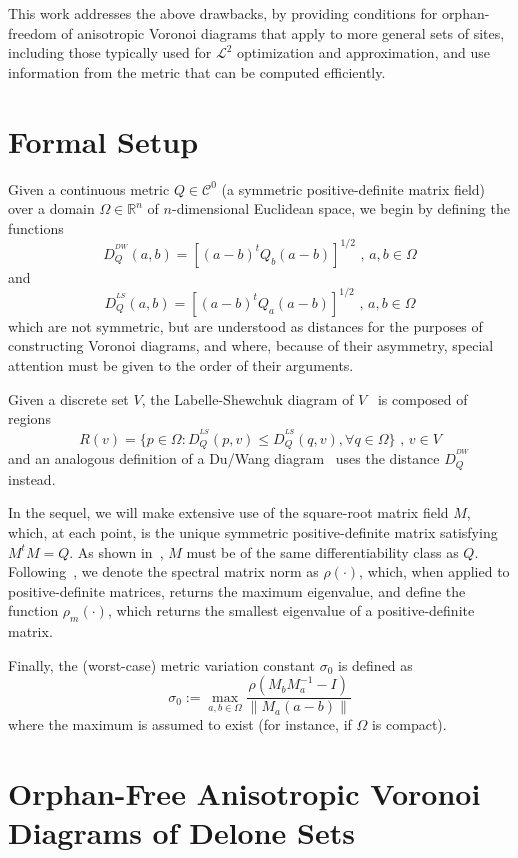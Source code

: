 \documentclass[11pt]{article}
\newcommand{\s}{\sigma}
\renewcommand{\O}{\Omega}
\begin{document}
This work addresses the above drawbacks, by providing conditions for orphan-freedom of anisotropic Voronoi diagrams that apply to more general sets of sites, 
including those typically used for $\mathcal{L}^2$ optimization and approximation, 
and use information from the metric that can be computed efficiently. 


 
\section{Formal Setup}

Given a continuous metric $Q\in\mathcal{C}^0$ (a symmetric positive-definite matrix field) over a domain $\O\in\mathbb{R}^n$ of $n$-dimensional Euclidean space, 
	we begin by defining the functions 
	\[ D_Q^{{ }^{DW}}(a,b) = \left[ (a-b)^t Q_b (a-b) \right]^{1/2} \text{ , } a,b\in\O\]
	and
	\[ D_Q^{{ }^{LS}}(a,b) = \left[ (a-b)^t Q_a (a-b) \right]^{1/2}  \text{ , } a,b\in\O \]
which are not symmetric, but are understood as distances for the purposes of constructing Voronoi diagrams, and where, because of their asymmetry, special attention must be given to the order of their arguments. 
	
Given a discrete set $V$, the Labelle-Shewchuk diagram of $V$~\cite{LS} is composed of regions
\[ R(v) = \{ p\in\O : D_Q^{{ }^{LS}}(p,v) \le D_Q^{{ }^{LS}}(q,v), \forall q\in\O \}  \text{ , } v\in V\]
and an analogous definition of a Du/Wang diagram~\cite{DW} uses the distance $D_Q^{{ }^{DW}}$ instead. 

In the sequel, we will make extensive use of the square-root matrix field $M$, which, at each point, is the unique symmetric positive-definite matrix satisfying $M^t M=Q$. 
As shown in~\cite{avd}, $M$ must be of the same differentiability class as $Q$. 
Following~\cite{avd}, we denote the spectral matrix norm  as $\rho(\cdot)$, which, when applied to positive-definite matrices, returns the maximum eigenvalue, and 
define the function $\rho_m(\cdot)$, which returns the smallest eigenvalue of a positive-definite matrix. 

Finally, the (worst-case) metric variation constant $\s_0$ is defined as
\[ \s_0 := \displaystyle{\max_{a,b\in\O} \frac{  \rho(M_b M_a^{-1} - I) }{ \|M_a(a-b)\| } } \]
where the maximum is assumed to exist (for instance, if $\O$ is compact). 






\section{Orphan-Free Anisotropic Voronoi Diagrams of Delone Sets}
\end{document}
